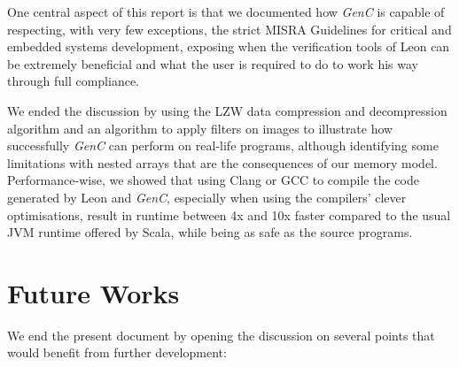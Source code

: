 \documentclass[a4paper,twoside]{article}
\let\oldsection\section
\renewcommand\section{\cleardoublepage\oldsection}
\newcommand{\GenC}{\emph{GenC}\xspace}
\begin{document}
One central aspect of this report is that we documented how \GenC is capable of
respecting, with very few exceptions, the strict MISRA Guidelines for critical
and embedded systems development, exposing when the verification tools of Leon
can be extremely beneficial and what the user is required to do to work his way
through full compliance.

We ended the discussion by using the LZW data compression and decompression
algorithm and an algorithm to apply filters on images to illustrate how
successfully \GenC can perform on real-life programs, although identifying some
limitations with nested arrays that are the consequences of our memory model.
Performance-wise, we showed that using Clang or GCC to compile the code
generated by Leon and \GenC, especially when using the compilers' clever
optimisations, result in runtime between 4x and 10x faster compared to the usual
JVM runtime offered by Scala, while being as safe as the source programs.


\section{Future Works}
\label{future_works}

We end the present document by opening the discussion on several points that
would benefit from further development:
\end{document}
